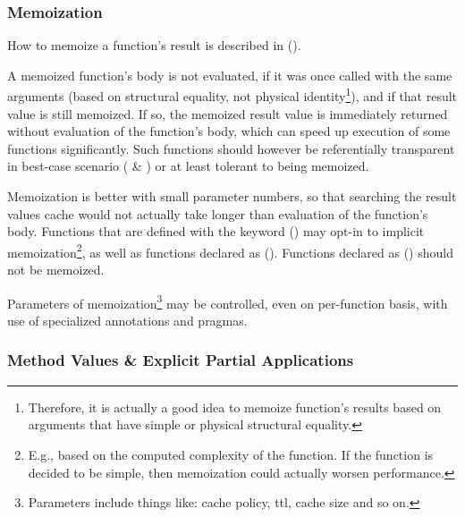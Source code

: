 \subsubsection{Memoization}
\label{sec:memoization}

How to memoize a function's result is described in ().

A memoized function's body is not evaluated, if it was once called with the same arguments (based on structural equality, not physical identity\footnote{Therefore, it is actually a good idea to memoize function's results based on arguments that have simple or physical structural equality.}), and if that result value is still memoized. If so, the memoized result value is immediately returned without evaluation of the function's body, which can speed up execution of some functions significantly. Such functions should however be referentially transparent in best-case scenario ( \& ) or at least tolerant to being memoized. 

Memoization is better with small parameter numbers, so that searching the result values cache would not actually take longer than evaluation of the function's body. Functions that are defined with the  keyword () may opt-in to implicit memoization\footnote{E.g., based on the computed complexity of the function. If the function is decided to be simple, then memoization could actually worsen performance.}, as well as functions declared as  (). Functions declared as  () should not be memoized. 

Parameters of memoization\footnote{Parameters include things like: cache policy, ttl, cache size and so on.} may be controlled, even on per-function basis, with use of specialized annotations and pragmas. 






\subsubsection{Method Values \& Explicit Partial Applications}
\label{sec:method-values}

